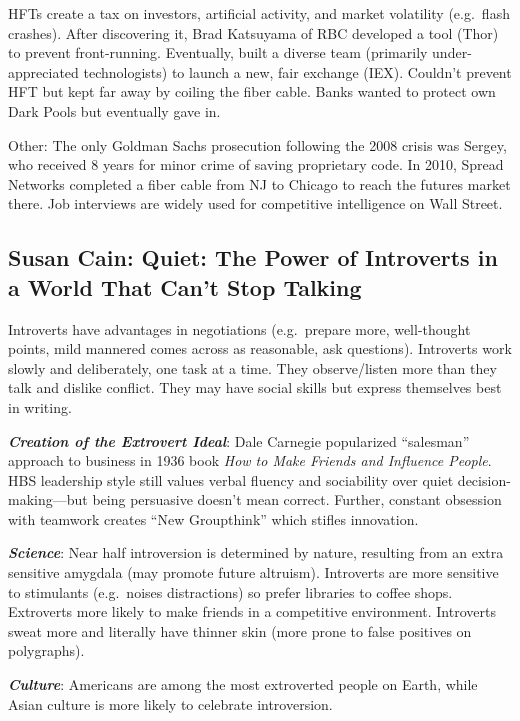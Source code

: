 \documentclass[
]{article}
\begin{document}
HFTs create a tax on investors, artificial activity, and market
volatility (e.g.~flash crashes). After discovering it, Brad Katsuyama of
RBC developed a tool (Thor) to prevent front-running. Eventually, built
a diverse team (primarily under-appreciated technologists) to launch a
new, fair exchange (IEX). Couldn't prevent HFT but kept far away by
coiling the fiber cable. Banks wanted to protect own Dark Pools but
eventually gave in.

Other: The only Goldman Sachs prosecution following the 2008 crisis was
Sergey, who received 8 years for minor crime of saving proprietary code.
In 2010, Spread Networks completed a fiber cable from NJ to Chicago to
reach the futures market there. Job interviews are widely used for
competitive intelligence on Wall Street.

\hypertarget{susan-cain-quiet-the-power-of-introverts-in-a-world-that-cant-stop-talking}{%
\subsection{Susan Cain: Quiet: The Power of Introverts in a World That
Can't Stop
Talking}\label{susan-cain-quiet-the-power-of-introverts-in-a-world-that-cant-stop-talking}}

Introverts have advantages in negotiations (e.g.~prepare more,
well-thought points, mild mannered comes across as reasonable, ask
questions). Introverts work slowly and deliberately, one task at a time.
They observe/listen more than they talk and dislike conflict. They may
have social skills but express themselves best in writing.

\textbf{\emph{Creation of the Extrovert Ideal}}: Dale Carnegie
popularized ``salesman'' approach to business in 1936 book \emph{How to
Make Friends and Influence People}. HBS leadership style still values
verbal fluency and sociability over quiet decision-making---but being
persuasive doesn't mean correct. Further, constant obsession with
teamwork creates ``New Groupthink'' which stifles innovation.

\textbf{\emph{Science}}: Near half introversion is determined by nature,
resulting from an extra sensitive amygdala (may promote future
altruism). Introverts are more sensitive to stimulants (e.g.~noises
distractions) so prefer libraries to coffee shops. Extroverts more
likely to make friends in a competitive environment. Introverts sweat
more and literally have thinner skin (more prone to false positives on
polygraphs).

\textbf{\emph{Culture}}: Americans are among the most extroverted people
on Earth, while Asian culture is more likely to celebrate introversion.
\end{document}
